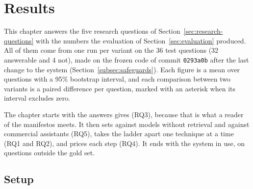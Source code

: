 \chapter{Results} \label{ch:results}

This chapter answers the five research questions of
Section~\ref{sec:research-questions} with the numbers the evaluation of
Section~\ref{sec:evaluation} produced. All of them come from one run per
variant on the 36 test questions (32 answerable and 4 not), made on the frozen
code of commit \texttt{0293a0b} after the last change to the system
(Section~\ref{subsec:safeguards}). Each figure is a mean over questions with a
95\% bootstrap interval, and each comparison between two variants is a paired
difference per question, marked with an asterisk when its interval excludes
zero.

The chapter starts with the answers \sysname{} gives (RQ3), because that is
what a reader of the manifestos meets. It then sets \sysname{} against models
without retrieval and against commercial assistants (RQ5), takes the ladder
apart one technique at a time (RQ1 and RQ2), and prices each step (RQ4). It
ends with the system in use, on questions outside the gold set.

\section{Setup} \label{sec:results-setup}

